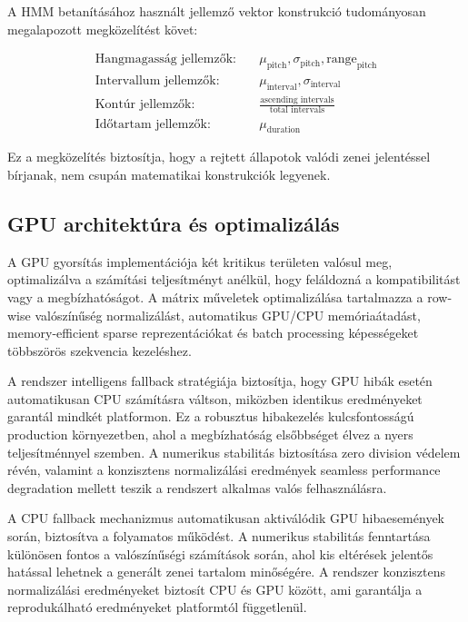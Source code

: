 A HMM betanításához használt jellemző vektor konstrukció tudományosan megalapozott megközelítést követ:

\begin{align}
\text{Hangmagasság jellemzők:} \quad &\mu_{\text{pitch}}, \sigma_{\text{pitch}}, \text{range}_{\text{pitch}} \\
\text{Intervallum jellemzők:} \quad &\mu_{\text{interval}}, \sigma_{\text{interval}} \\
\text{Kontúr jellemzők:} \quad &\frac{\text{ascending intervals}}{\text{total intervals}} \\
\text{Időtartam jellemzők:} \quad &\mu_{\text{duration}}
\end{align}

Ez a megközelítés biztosítja, hogy a rejtett állapotok valódi zenei jelentéssel bírjanak, nem csupán matematikai konstrukciók legyenek.

\subsection{GPU architektúra és optimalizálás}

A GPU gyorsítás implementációja két kritikus területen valósul meg, optimalizálva a számítási teljesítményt anélkül, hogy feláldozná a kompatibilitást vagy a megbízhatóságot. A mátrix műveletek optimalizálása tartalmazza a row-wise valószínűség normalizálást, automatikus GPU/CPU memóriaátadást, memory-efficient sparse reprezentációkat és batch processing képességeket többszörös szekvencia kezeléshez.

A rendszer intelligens fallback stratégiája biztosítja, hogy GPU hibák esetén automatikusan CPU számításra váltson, miközben identikus eredményeket garantál mindkét platformon. Ez a robusztus hibakezelés kulcsfontosságú production környezetben, ahol a megbízhatóság elsőbbséget élvez a nyers teljesítménnyel szemben. A numerikus stabilitás biztosítása zero division védelem révén, valamint a konzisztens normalizálási eredmények seamless performance degradation mellett teszik a rendszert alkalmas valós felhasználásra.

A CPU fallback mechanizmus automatikusan aktiválódik GPU hibaesemények során, biztosítva a folyamatos működést. A numerikus stabilitás fenntartása különösen fontos a valószínűségi számítások során, ahol kis eltérések jelentős hatással lehetnek a generált zenei tartalom minőségére. A rendszer konzisztens normalizálási eredményeket biztosít CPU és GPU között, ami garantálja a reprodukálható eredményeket platformtól függetlenül.

